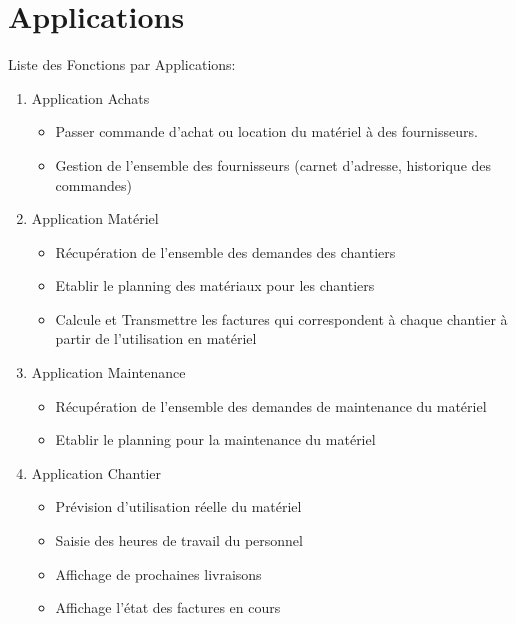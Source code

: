 \documentclass [a4paper] {report}
\begin{document}
\section{Applications}

Liste des Fonctions par Applications:

\begin{enumerate}
\item Application Achats
\begin{itemize}
\item Passer commande d'achat ou location du matériel à des fournisseurs.
\item Gestion de l'ensemble des fournisseurs (carnet d'adresse, historique des commandes)
\end{itemize}
\item Application Matériel
\begin{itemize}
\item Récupération de l'ensemble des demandes des chantiers
\item Etablir le planning des matériaux pour les chantiers
\item Calcule et Transmettre les factures qui correspondent à chaque chantier à partir de l'utilisation en matériel 
\end{itemize}
\item Application Maintenance
\begin{itemize}
\item Récupération de l'ensemble des demandes de maintenance du matériel
\item Etablir le planning pour la maintenance du matériel
\end{itemize}
\item Application Chantier
\begin{itemize}
\item Prévision d'utilisation réelle du matériel
\item Saisie des heures de travail du personnel
\item Affichage de prochaines livraisons
\item Affichage l'état des factures en cours
\end{itemize}
\end{enumerate}
\end{document}
